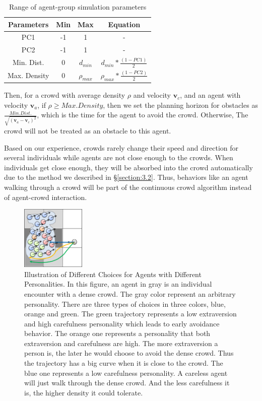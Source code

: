 \documentclass[conference]{acmsiggraph}
\begin{document}
\begin{table}  
\centering  
\begin{tabular}{|c|c|c|c|}
\hline 
Parameters & Min & Max & Equation \\ 
\hline 
PC1 & -1 & 1 & - \\ 
\hline 
PC2 & -1 & 1 & - \\ 
\hline 
Min. Dist. & 0 & $d_{min}$ & $d_{min}*\frac{(1 - PC1)}{2}$ \\ 
\hline 
Max. Density & 0 & $\rho_{max}$ & $\rho_{max}*\frac{(1 - PC2)}{2}$ \\ 
\hline 
\end{tabular} 
\caption{Range of agent-group simulation parameters}  
\label{table:1}
\end{table}

Then, for a crowd with average density $\rho$ and velocity $\textbf{v}_c$, and an agent with velocity $\textbf{v}_a$, if $\rho \geq Max. Density$, then we set the planning horizon for obstacles as $\frac{Min.Dist.}{\sqrt{(\textbf{v}_a-\textbf{v}_c)^2}}$, which is the time for the agent to avoid the crowd. Otherwise, The crowd will not be treated as an obstacle to this agent.

Based on our experience, crowds rarely change their speed and direction for several individuals while agents are not close enough to the crowds. When individuals get close enough, they will be absorbed into the crowd automatically due to the method we described in \S\ref{section:3.2}. Thus, behaviors like an agent walking through a crowd will be part of the continuous crowd algorithm instead of agent-crowd interaction.
\begin{figure}
  \centering
  \includegraphics[width=1.2in]{images/agent_crowd_choices}
  \caption{Illustration of Different Choices for Agents with Different Personalities. In this figure, an agent in gray is an individual encounter with a dense crowd. The gray color represent an arbitrary personality. There are three types of choices in three colors, blue, orange and green. The green trajectory represents a low extraversion and high carefulness personality which leads to early avoidance behavior. The orange one represents a personality that both extraversion and carefulness are high. The more extraversion a person is, the later he would choose to avoid the dense crowd. Thus the trajectory has a big curve when it is close to the crowd. The blue one represents a low carefulness personality. A careless agent will just walk through the dense crowd. And the less carefulness it is, the higher density it could tolerate.}
  \label{figure:agentcrowdchoice}
\end{figure}
\end{document}
